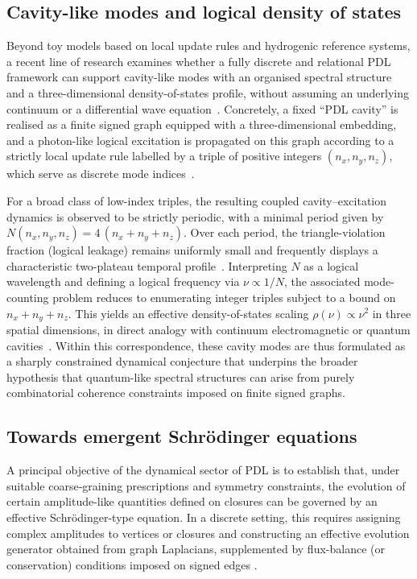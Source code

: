 \documentclass[11pt,a4paper]{article}
\begin{document}
\subsection{Cavity-like modes and logical density of states}
\label{subsec:cavity_modes}

Beyond toy models based on local update rules and hydrogenic reference systems, a recent line of research examines whether a fully discrete and relational PDL framework can support cavity-like modes with an organised spectral structure and a three-dimensional density-of-states profile, without assuming an underlying continuum or a differential wave equation~\citep{Effective_Fields_PDL_2026,PDLCavityModes2026}. Concretely, a fixed “PDL cavity” is realised as a finite signed graph equipped with a three-dimensional embedding, and a photon-like logical excitation is propagated on this graph according to a strictly local update rule labelled by a triple of positive integers $(n_x,n_y,n_z)$, which serve as discrete mode indices~\citep{PDLCavityModes2026}.

For a broad class of low-index triples, the resulting coupled cavity–excitation dynamics is observed to be strictly periodic, with a minimal period given by $N(n_x,n_y,n_z)=4\,(n_x+n_y+n_z)$. Over each period, the triangle-violation fraction (logical leakage) remains uniformly small and frequently displays a characteristic two-plateau temporal profile~\citep{PDLCavityModes2026}. Interpreting $N$ as a logical wavelength and defining a logical frequency via $\nu\propto 1/N$, the associated mode-counting problem reduces to enumerating integer triples subject to a bound on $n_x+n_y+n_z$. This yields an effective density-of-states scaling $\rho(\nu)\propto \nu^2$ in three spatial dimensions, in direct analogy with continuum electromagnetic or quantum cavities~\citep{PDLCavityModes2026}. Within this correspondence, these cavity modes are thus formulated as a sharply constrained dynamical conjecture that underpins the broader hypothesis that quantum-like spectral structures can arise from purely combinatorial coherence constraints imposed on finite signed graphs.

\subsection{Towards emergent Schr\"odinger equations}
\label{subsec:emergent_schrodinger}

A principal objective of the dynamical sector of PDL is to establish that, under suitable coarse‑graining prescriptions and symmetry constraints, the evolution of certain amplitude-like quantities defined on closures can be governed by an effective Schr\"odinger-type equation. In a discrete setting, this requires assigning complex amplitudes to vertices or closures and constructing an effective evolution generator obtained from graph Laplacians, supplemented by flux-balance (or conservation) conditions imposed on signed edges \citep{Coherence_Leakage_18_2026,Coherence_Leakage_18_2026}.
\end{document}
